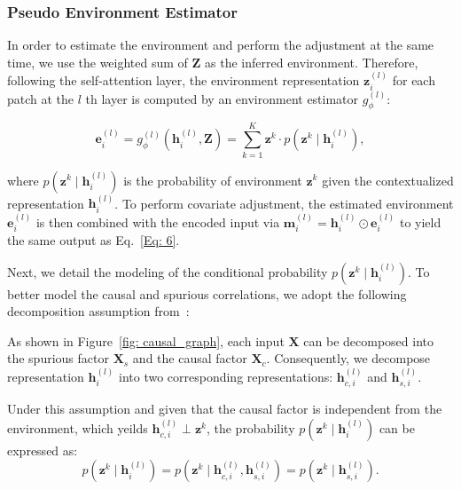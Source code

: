 \subsubsection{Pseudo Environment Estimator}
\label{sec: env_estimate}

 In order to estimate the environment and perform the adjustment at the same time, we use the weighted sum of $\mathbf{Z}$ as the inferred environment. Therefore, following the self-attention layer, the environment representation \( \mathbf{z}_i^{(l)} \) for each patch at the $l$ th layer is computed by an environment estimator $g_{\phi}^{(l)}$:

\vspace{-3mm}
\[
\label{Eq: env_estimator}
\mathbf{e}_i^{(l)} = g_{\phi}^{(l)}(\mathbf{h}_i^{(l)}, \mathbf{Z}) = \sum_{k=1}^{K} \mathbf{z}^k \cdot p(\mathbf{z}^k \mid \mathbf{h}_i^{(l)}), \tag{3}
\]
\vspace{-3mm}

where \( p(\mathbf{z}^k \mid \mathbf{h}_i^{(l)}) \) is the probability of environment \( \mathbf{z}^k \) given the contextualized representation \( \mathbf{h}_i^{(l)} \). To perform covariate adjustment, the estimated environment \( \mathbf{e}_i^{(l)} \) is then combined with the encoded input via $\mathbf{m}_i^{(l)} = \mathbf{h}_i^{(l)} \odot \mathbf{e}_i^{(l)}$ to yield the same output as Eq.~\ref{Eq: 6}.

Next, we detail the modeling of the conditional probability \( p(\mathbf{z}^k \mid \mathbf{h}_i^{(l)}) \). To better model the causal and spurious correlations, we adopt the following decomposition assumption from~\cite{mao2022causal}:
 
\begin{assumption}
As shown in Figure~\ref{fig: causal_graph}, each input $\mathbf{X}$ can be decomposed into the spurious factor $\mathbf{X}_s$ and the causal factor $\mathbf{X}_c$. Consequently, we decompose representation \( \mathbf{h}_i^{(l)} \) into two corresponding representations:  \( \mathbf{h}_{c,i}^{(l)} \) and \( \mathbf{h}_{s,i}^{(l)} \).
\end{assumption} 

Under this assumption and given that the causal factor is independent from the environment, which yeilds \( \mathbf{h}_{c,i}^{(l)} \perp \mathbf{z}^k \), the probability \( p(\mathbf{z}^k \mid \mathbf{h}_i^{(l)}) \) can be expressed as:
\[
p(\mathbf{z}^k \mid \mathbf{h}_i^{(l)}) = p(\mathbf{z}^k \mid \mathbf{h}_{c,i}^{(l)}, \mathbf{h}_{s,i}^{(l)}) = p(\mathbf{z}^k \mid \mathbf{h}_{s,i}^{(l)}). \tag{4}
\]

